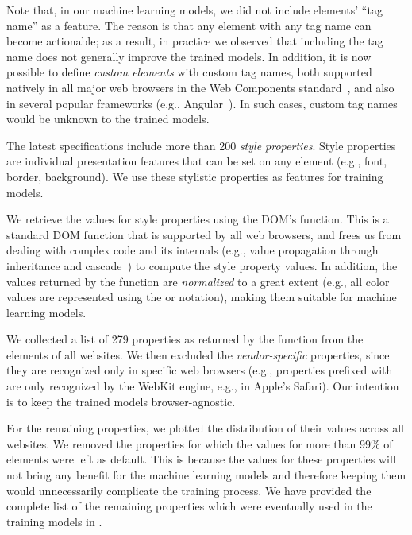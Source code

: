 Note that, in our machine learning models,
we did not include elements' ``tag name'' as a feature.
The reason is that 
any element with any tag name can become actionable;
as a result, in practice we observed that including the tag name does not generally 
improve the trained models.
In addition, it is now possible to define \textit{custom \html elements}
with custom tag names,
both supported natively in all major web browsers in the 
Web Components standard~\cite{web-components},
and also in several popular frameworks (e.g., Angular~\cite{angular-custom-elements}).
In such cases, custom tag names would be unknown to the trained models.
	
	
The latest \css specifications \cite{css-specs} include more than 200 \textit{style properties}.
Style properties are individual presentation features that can be set on any element
(e.g., font, border, background).
We use these stylistic properties 
as features for training models.

We retrieve the values for \css style properties 
using the DOM's  function.
This is a standard DOM function that is supported by all web browsers,
and frees us from dealing with complex \css code and its internals
(e.g., \css value propagation through inheritance and cascade~\cite{css-cascade-inheritance})
to compute the style property values.
In addition, the values returned by the  function
are \textit{normalized} to a great extent
(e.g., all color values are represented using the  or  notation),
making them suitable for machine learning models. %

We collected a list of 279 \css properties
as returned by the  function from the elements of all websites.
We then excluded the \textit{vendor-specific} \css properties,
since they are recognized only in specific web browsers 
(e.g., properties prefixed with  are only recognized by the WebKit engine, e.g., in Apple's Safari).
Our intention is to keep the trained models browser-agnostic.

For the remaining \css properties,
we plotted the distribution of their values across all websites.
We removed the \css properties for which the values for more than 99\% of elements were left as default.
This is because the values for these \css properties will not bring any benefit
for the machine learning models 
and therefore keeping them would unnecessarily complicate the training process.
We have provided the complete list of the remaining \css properties
which were eventually used in the training models in .

